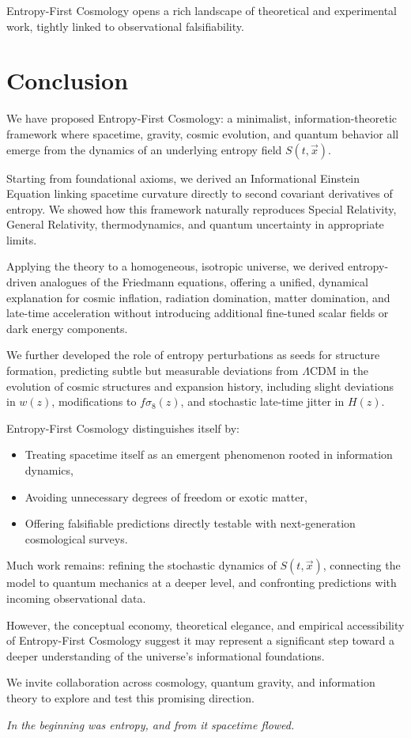 \documentclass{article}
\begin{document}
Entropy-First Cosmology opens a rich landscape of theoretical and experimental work, tightly linked to observational falsifiability.

\section{Conclusion}

We have proposed Entropy-First Cosmology: a minimalist, information-theoretic framework where spacetime, gravity, cosmic evolution, and quantum behavior all emerge from the dynamics of an underlying entropy field $S(t, \vec{x})$.

Starting from foundational axioms, we derived an Informational Einstein Equation linking spacetime curvature directly to second covariant derivatives of entropy.
We showed how this framework naturally reproduces Special Relativity, General Relativity, thermodynamics, and quantum uncertainty in appropriate limits.

Applying the theory to a homogeneous, isotropic universe, we derived entropy-driven analogues of the Friedmann equations, offering a unified, dynamical explanation for cosmic inflation, radiation domination, matter domination, and late-time acceleration without introducing additional fine-tuned scalar fields or dark energy components.

We further developed the role of entropy perturbations as seeds for structure formation, predicting subtle but measurable deviations from $\Lambda$CDM in the evolution of cosmic structures and expansion history, including slight deviations in $w(z)$, modifications to $f\sigma_8(z)$, and stochastic late-time jitter in $H(z)$.

Entropy-First Cosmology distinguishes itself by:
\begin{itemize}
    \item Treating spacetime itself as an emergent phenomenon rooted in information dynamics,
    \item Avoiding unnecessary degrees of freedom or exotic matter,
    \item Offering falsifiable predictions directly testable with next-generation cosmological surveys.
\end{itemize}

Much work remains: refining the stochastic dynamics of $S(t, \vec{x})$, connecting the model to quantum mechanics at a deeper level, and confronting predictions with incoming observational data.

However, the conceptual economy, theoretical elegance, and empirical accessibility of Entropy-First Cosmology suggest it may represent a significant step toward a deeper understanding of the universe's informational foundations.

We invite collaboration across cosmology, quantum gravity, and information theory to explore and test this promising direction.

\begin{center}
\textit{In the beginning was entropy, and from it spacetime flowed.}
\end{center}
\end{document}
